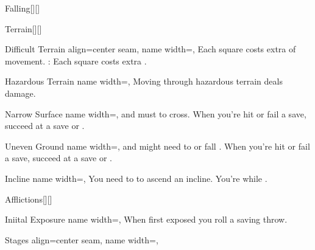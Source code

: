 \begin{PageBack}
\begin{Tables}{\backTableHeight}
\begin{Table}{Falling}[][]
        \end{Table}\TableSpace
        \begin{Table}{Terrain}[][]
            \begin{entry}{Difficult Terrain}{%
                align=center seam,
                name width=\turnLength,}
                Each square costs  extra \Feet of movement. \hfill
                {\textbf{}}: Each square costs  extra \Feet. \\\hfill
            \end{entry}
            \begin{entry}{Hazardous Terrain}{%
                name width=\turnLength,}
                Moving through hazardous terrain deals damage.
            \end{entry}
            \begin{entry}{Narrow Surface}{%
                name width=\turnLength,}
                \OffGuard and must  to cross. When you're hit or fail a save, succeed at a \ReflexT save or .
            \end{entry}
            \begin{entry}{Uneven Ground}{%
                name width=\turnLength,}
                \OffGuard and might need to  or fall \Prone. When you're hit or fail a save, succeed at a \ReflexT save or .
            \end{entry}
            \begin{entry}{Incline}{%
                name width=\turnLength,}
                You need to  to ascend an incline. You're \OffGuard while .
            \end{entry}
        \end{Table}\TableSpace
        \begin{Table}{Afflictions}[][]
            \begin{entry}{Iniital Exposure}{%
                name width=\turnLength,%
            }
                When first exposed you roll a saving throw.   \hfill
            \end{entry}
            \begin{entry}{Stages}{%
                align=center seam,
                name width=\turnLength,}

\end{entry}
\end{Table}
\end{Tables}
\end{PageBack}
